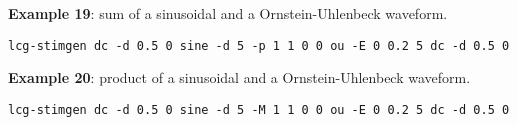 \textbf{Example 19}: sum of a sinusoidal and a Ornstein-Uhlenbeck
waveform.
\begin{lstlisting}
lcg-stimgen dc -d 0.5 0 sine -d 5 -p 1 1 0 0 ou -E 0 0.2 5 dc -d 0.5 0
\end{lstlisting}

\textbf{Example 20}: product of a sinusoidal and a Ornstein-Uhlenbeck
waveform.
\begin{lstlisting}
lcg-stimgen dc -d 0.5 0 sine -d 5 -M 1 1 0 0 ou -E 0 0.2 5 dc -d 0.5 0
\end{lstlisting}

